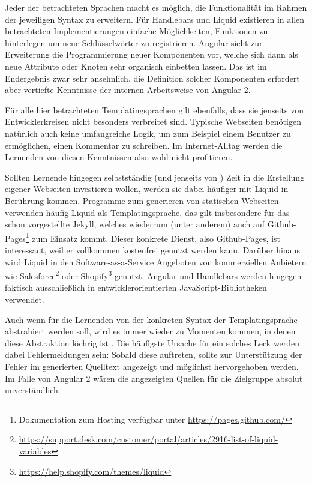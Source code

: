 Jeder der betrachteten Sprachen macht es möglich, die Funktionalität im Rahmen der jeweiligen Syntax zu erweitern. Für Handlebars und Liquid existieren in allen betrachteten Implementierungen einfache Möglichkeiten, Funktionen zu hinterlegen um neue Schlüsselwörter zu registrieren. Angular sieht zur Erweiterung die Programmierung neuer Komponenten vor, welche sich dann als neue Attribute oder Knoten sehr organisch einbetten lassen. Das ist im Endergebnis zwar sehr ansehnlich, die Definition solcher Komponenten erfordert aber vertiefte Kenntnisse der internen Arbeitsweise von Angular 2.

Für alle hier betrachteten Templatingsprachen gilt ebenfalls, dass sie jenseits von Entwicklerkreisen nicht besonders verbreitet sind. Typische Webseiten benötigen natürlich auch keine umfangreiche Logik, um zum Beispiel einem Benutzer zu ermöglichen, einen Kommentar zu schreiben. Im Internet-Alltag werden die Lernenden von diesen Kenntnissen also wohl nicht profitieren.

Sollten Lernende hingegen selbstständig (und jenseits von \idename{}) Zeit in die Erstellung eigener Webseiten investieren wollen, werden sie dabei häufiger mit Liquid in Berührung kommen. Programme zum generieren von statischen Webseiten verwenden häufig Liquid als Templatingsprache, das gilt insbesondere für das schon vorgestellte Jekyll, welches wiederrum (unter anderem) auch auf Github-Pages\footnote{Dokumentation zum Hosting verfügbar unter \url{https://pages.github.com/}} zum Einsatz kommt. Dieser konkrete Dienst, also Github-Pages, ist interessant, weil er vollkommen kostenfrei genutzt werden kann. Darüber hinaus wird Liquid in den Software-as-a-Service Angeboten von kommerziellen Anbietern wie Salesforce\footnote{\url{https://support.desk.com/customer/portal/articles/2916-list-of-liquid-variables}} oder Shopify\footnote{\url{https://help.shopify.com/themes/liquid}} genutzt. Angular und Handlebars werden hingegen faktisch ausschließlich in entwicklerorientierten JavaScript-Bibliotheken verwendet.

Auch wenn für die Lernenden von der konkreten Syntax der Templatingsprache abstrahiert werden soll, wird es immer wieder zu Momenten kommen, in denen diese Abstraktion löchrig ist \cite{spolsky_law_abstractions}. Die häufigste Ursache für ein solches Leck werden dabei Fehlermeldungen sein: Sobald diese auftreten, sollte zur Unterstützung der Fehler im generierten Quelltext angezeigt und möglichst hervorgehoben werden. Im Falle von Angular 2 wären die angezeigten Quellen für die Zielgruppe absolut unverständlich.

